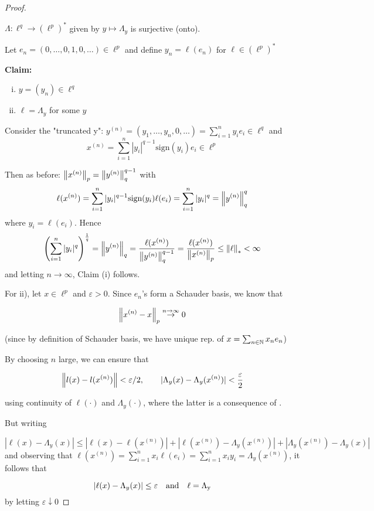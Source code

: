 \documentclass{article}
\begin{document}
\begin{proof}
\begin{lemma}
     \(\Lambda: \ell^q \to (\ell^p)^*\) given by  \(y \mapsto \Lambda_y\) is surjective (onto).
\end{lemma}  
Let  \(e_n = (0, \ldots, 0, 1, 0, \ldots) \in \ell^p\) and define  \(y_n = \ell(e_n)\) for  \(\ell \in (\ell^p)^*\)

\textbf{Claim:} 
\begin{enumerate}[i)]
    \item  \(y = (y_n) \in \ell^q\)
    \item  \(\ell = \Lambda_y\) for some  \(y\)
\end{enumerate}  

Consider the "truncated y":  \(y^{(n)}=(y_1, \ldots, y_n, 0, \ldots) = \sum_{i=1}^n y_i e_i \in \ell^q\) and 
\[x^{(n)}=\sum_{i=1}^{n}|y_{i}|^{q-1} \textrm{sign}(y_i) e_i \in \ell^p\] 

Then as before:  \(\left\|{x^{(n)}}\right\|_p = \left\|{y^{(n)}}\right\|_q^{q-1}\)  
with 
\[
\ell(x^{(n)})=\sum_{i=1}^{n}|y_{i}|^{q-1} \textrm{sign}(y_i) \ell(e_i) = \sum_{i=1}^n |y_i|^q=\left\|{y^{(n)}}\right\|^q_q  
\]
where  \(y_i = \ell(e_i)\). Hence
\[
 \left(\sum_{i=1}^n |y_i|^q \right)^{\frac{1}{q}} = \left\|{y^{(n)}}\right\|_q = \frac{\ell(x^{(n)})}{\left\|{y^{(n)}}\right\|_q^{q-1}} = \frac{\ell(x^{(n)})}{\left\|{x^{(n)}}\right\|_p} \leq \left\|{\ell}\right\|_* < \infty
\]
and letting  \(n \to \infty\), Claim (i) follows.  

For ii), let  \(x \in \ell^p\) and  \(\varepsilon > 0\). Since  \(e_n\)'s form a Schauder basis, we know that  

\[\left\|{x^{(n)}-x}\right\|_p \overset{n \to \infty}{\rightarrow} 0\]  

(since by definition of Schauder basis, we have unique rep. of  \(x = \sum_{n \in \mathbb{N}} x_n e_n\))

By choosing  \(n\) large, we can ensure that  

\[\left\|{l(x)-l(x^{(n)})}\right\|<\varepsilon/2, \qquad |\Lambda_y(x)-\Lambda_y(x^{(n)})| < \frac{\varepsilon}{2}\]  

using continuity of  \(\ell(\cdot)\) and  \(\Lambda_y(\cdot)\), where the latter is a consequence of .  

But writing  

\begin{equation}
|\ell(x)-\Lambda_y(x)| \leq |\ell(x)- \ell(x^{(n)})| + |\ell(x^{(n)}) - \Lambda_y(x^{(n)})|+|\Lambda_y(x^{(n)})-\Lambda_y(x)|
\end{equation}  
and observing that  \(\ell(x^{(n)})=\sum_{i=1}^n x_i \ell(e_i) = \sum_{i=1}^n x_i y_i = \Lambda_y(x^{(n)})\), it follows that  

\[
|\ell(x)-\Lambda_y(x)| \leq \varepsilon \quad \rm{and} \quad \ell=\Lambda_y
\]  
by letting  \(\varepsilon \downarrow 0\)
\end{proof}
\end{document}
